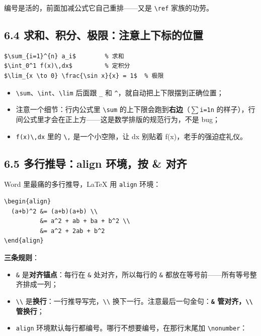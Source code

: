 编号是活的，前面加减公式它自己重排——又是 \texttt{\textbackslash{}ref} 家族的功劳。

\subsection*{6.4 求和、积分、极限：注意上下标的位置}

\begin{lstlisting}
$\sum_{i=1}^{n} a_i$        % 求和
$\int_0^1 f(x)\,dx$         % 定积分
$\lim_{x \to 0} \frac{\sin x}{x} = 1$  % 极限
\end{lstlisting}

\begin{itemize}
\setlength{\itemsep}{2pt}
\item \texttt{\textbackslash{}sum}、\texttt{\textbackslash{}int}、\texttt{\textbackslash{}lim} 后面跟 \texttt{\_} 和 \texttt{\textasciicircum{}}，就自动把上下限摆到正确位置；
\item 注意一个细节：行内公式里 \texttt{\textbackslash{}sum} 的上下限会跑到\textbf{右边}（\texttt{\ensuremath{\sum}i=1n} 的样子），行间公式里才会在正上方——这是数学排版的规范行为，不是 bug；
\item \texttt{f(x)\textbackslash{},dx} 里的 \texttt{\textbackslash{},} 是一个小空隙，让 dx 别贴着 f(x)，老手的强迫症礼仪。
\end{itemize}

\subsection*{6.5 多行推导：align 环境，按 \& 对齐}

Word 里最痛的多行推导，LaTeX 用 \texttt{align} 环境：

\begin{lstlisting}
\begin{align}
  (a+b)^2 &= (a+b)(a+b) \\
          &= a^2 + ab + ba + b^2 \\
          &= a^2 + 2ab + b^2
\end{align}
\end{lstlisting}

\textbf{三条规则}：

\begin{itemize}
\setlength{\itemsep}{2pt}
\item \texttt{\&} 是\textbf{对齐锚点}：每行在 \texttt{\&} 处对齐，所以每行的 \texttt{\&} 都放在等号前——所有等号整齐排成一列；
\item \texttt{\textbackslash{}\textbackslash{}} 是\textbf{换行}：一行推导写完，\texttt{\textbackslash{}\textbackslash{}} 换下一行。注意最后一句金句：\textbf{\texttt{\&} 管对齐，\texttt{\textbackslash{}\textbackslash{}} 管换行}；
\item \texttt{align} 环境默认每行都编号。哪行不想要编号，在那行末尾加 \texttt{\textbackslash{}nonumber}：
\end{itemize}

